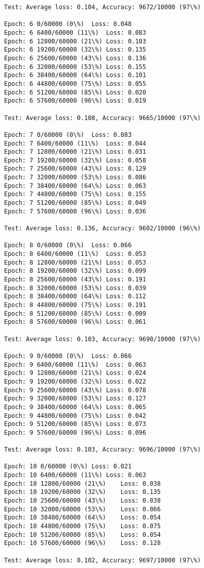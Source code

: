 \documentclass[11pt]{article}
\begin{document}
\begin{Verbatim}[commandchars=\\\{\}]
Test: Average loss: 0.104, Accuracy: 9672/10000 (97\%)

Epoch: 6 0/60000 (0\%)	Loss: 0.048
Epoch: 6 6400/60000 (11\%)	Loss: 0.083
Epoch: 6 12800/60000 (21\%)	Loss: 0.103
Epoch: 6 19200/60000 (32\%)	Loss: 0.135
Epoch: 6 25600/60000 (43\%)	Loss: 0.136
Epoch: 6 32000/60000 (53\%)	Loss: 0.155
Epoch: 6 38400/60000 (64\%)	Loss: 0.101
Epoch: 6 44800/60000 (75\%)	Loss: 0.055
Epoch: 6 51200/60000 (85\%)	Loss: 0.020
Epoch: 6 57600/60000 (96\%)	Loss: 0.019

Test: Average loss: 0.108, Accuracy: 9665/10000 (97\%)

Epoch: 7 0/60000 (0\%)	Loss: 0.083
Epoch: 7 6400/60000 (11\%)	Loss: 0.044
Epoch: 7 12800/60000 (21\%)	Loss: 0.031
Epoch: 7 19200/60000 (32\%)	Loss: 0.058
Epoch: 7 25600/60000 (43\%)	Loss: 0.129
Epoch: 7 32000/60000 (53\%)	Loss: 0.086
Epoch: 7 38400/60000 (64\%)	Loss: 0.063
Epoch: 7 44800/60000 (75\%)	Loss: 0.155
Epoch: 7 51200/60000 (85\%)	Loss: 0.049
Epoch: 7 57600/60000 (96\%)	Loss: 0.036

Test: Average loss: 0.136, Accuracy: 9602/10000 (96\%)

Epoch: 8 0/60000 (0\%)	Loss: 0.066
Epoch: 8 6400/60000 (11\%)	Loss: 0.053
Epoch: 8 12800/60000 (21\%)	Loss: 0.053
Epoch: 8 19200/60000 (32\%)	Loss: 0.099
Epoch: 8 25600/60000 (43\%)	Loss: 0.191
Epoch: 8 32000/60000 (53\%)	Loss: 0.039
Epoch: 8 38400/60000 (64\%)	Loss: 0.112
Epoch: 8 44800/60000 (75\%)	Loss: 0.191
Epoch: 8 51200/60000 (85\%)	Loss: 0.009
Epoch: 8 57600/60000 (96\%)	Loss: 0.061

Test: Average loss: 0.103, Accuracy: 9690/10000 (97\%)

Epoch: 9 0/60000 (0\%)	Loss: 0.066
Epoch: 9 6400/60000 (11\%)	Loss: 0.063
Epoch: 9 12800/60000 (21\%)	Loss: 0.024
Epoch: 9 19200/60000 (32\%)	Loss: 0.022
Epoch: 9 25600/60000 (43\%)	Loss: 0.078
Epoch: 9 32000/60000 (53\%)	Loss: 0.127
Epoch: 9 38400/60000 (64\%)	Loss: 0.065
Epoch: 9 44800/60000 (75\%)	Loss: 0.042
Epoch: 9 51200/60000 (85\%)	Loss: 0.073
Epoch: 9 57600/60000 (96\%)	Loss: 0.096

Test: Average loss: 0.103, Accuracy: 9696/10000 (97\%)

Epoch: 10 0/60000 (0\%)	Loss: 0.021
Epoch: 10 6400/60000 (11\%)	Loss: 0.063
Epoch: 10 12800/60000 (21\%)	Loss: 0.038
Epoch: 10 19200/60000 (32\%)	Loss: 0.135
Epoch: 10 25600/60000 (43\%)	Loss: 0.038
Epoch: 10 32000/60000 (53\%)	Loss: 0.066
Epoch: 10 38400/60000 (64\%)	Loss: 0.054
Epoch: 10 44800/60000 (75\%)	Loss: 0.075
Epoch: 10 51200/60000 (85\%)	Loss: 0.054
Epoch: 10 57600/60000 (96\%)	Loss: 0.128

Test: Average loss: 0.102, Accuracy: 9697/10000 (97\%)


    \end{Verbatim}
\end{document}
